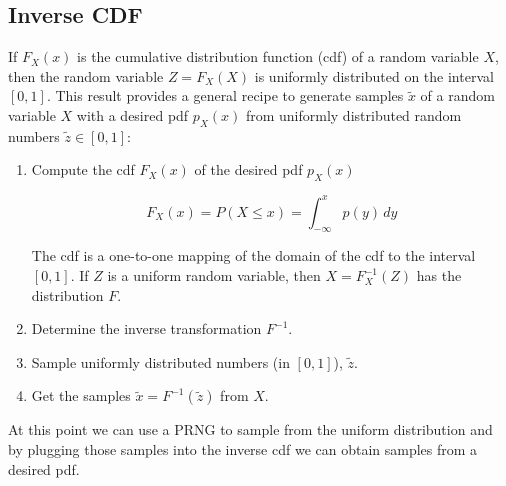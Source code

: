 \subsection{Inverse CDF}

If $F_{X}(x)$ is the cumulative
  distribution function (cdf) of a random variable $X$, then the
random variable $Z = F_{X}(X)$ is uniformly distributed on the
interval $[0,1]$. This result provides 
a general recipe to generate
samples $\tilde x$ of a random variable $X$ with a desired pdf $p_X(x)$
from uniformly distributed random numbers $\tilde z \in [0,1]$:
\begin{enumerate}
\item Compute the cdf $F_X(x)$ of the desired pdf $p_X(x)$

\begin{equation}
F_X(x) = P(X \leq x) = \int_{-\infty}^{x} p(y)\,dy
\end{equation}

The cdf is a one-to-one mapping of the domain of the cdf to the interval $[0,1]$.
 If $Z$ is a uniform random variable, then $X=F_X^{-1}(Z)$ has the distribution $F$.

\item Determine the inverse transformation $F^{-1}$.

\item Sample uniformly distributed numbers (in $[0,1]$), $\tilde z$.
\item Get the samples $\tilde x=F^{-1}(\tilde z)$ from $X$. 
\end{enumerate}

At this point we can use a PRNG to sample from the uniform distribution and 
by plugging those samples into the inverse cdf we can obtain samples from a desired pdf.
